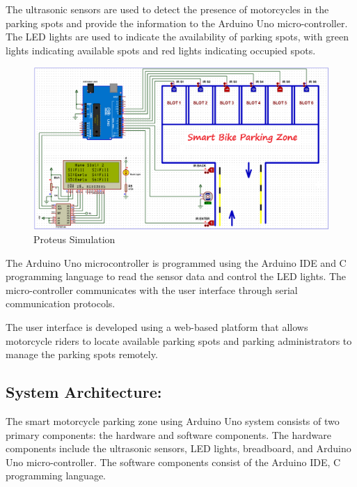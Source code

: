 \documentclass[conference]{IEEEtran}
\begin{document}
The ultrasonic sensors are used to detect the presence of motorcycles in the parking spots and provide the information to the Arduino Uno micro-controller. The LED lights are used to indicate the availability of parking spots, with green lights indicating available spots and red lights indicating occupied spots.
\begin{figure}[htbp]
	\centerline{\includegraphics[scale=0.25]{Proteus Simulation.png}}
	\caption{Proteus Simulation}
	\label{fig}
\end{figure}

The Arduino Uno microcontroller is programmed using the Arduino IDE and C programming language to read the sensor data and control the LED lights. The micro-controller communicates with the user interface through serial communication protocols.

The user interface is developed using a web-based platform that allows motorcycle riders to locate available parking spots and parking administrators to manage the parking spots remotely.
	\subsection{System Architecture:}
	The smart motorcycle parking zone using Arduino Uno system consists of two primary components: the hardware and software components. The hardware components include the ultrasonic sensors, LED lights, breadboard, and Arduino Uno micro-controller. The software components consist of the Arduino IDE, C programming language.\cite{b7}
\end{document}
